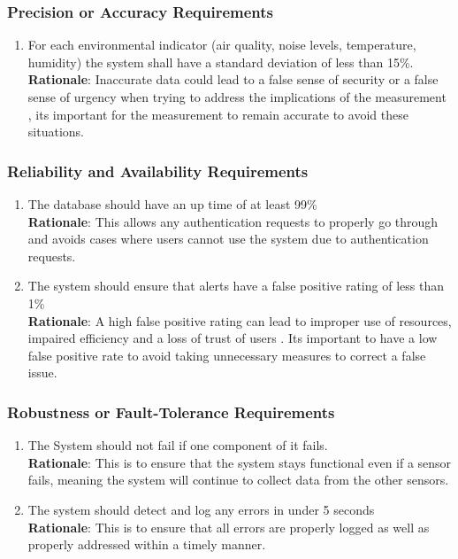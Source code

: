 \documentclass[]{article}
\begin{document}
\subsubsection{Precision or Accuracy Requirements}
\label{ssub:precision_or_accuracy_requirements}
\begin{enumerate}[{PR-PA}1. ]
	\item For each environmental indicator (air quality, noise levels, temperature, humidity) the system shall have a standard deviation of less than 15\%.\\
    \textbf{Rationale}: Inaccurate data could lead to a false sense of security or a false sense of urgency when trying to address the implications of the measurement \cite{envmon}, its important for the measurement to remain accurate to avoid these situations.
\end{enumerate}

\subsubsection{Reliability and Availability Requirements}
\label{ssub:reliability_and_availability_requirements}
\begin{enumerate}[{PR-RA}1. ]
	\item The database should have an up time of at least 99\%\\
    \textbf{Rationale}: This allows any authentication requests to properly go through and avoids cases where users cannot use the system due to authentication requests.
    \item The system should ensure that alerts have a false positive rating of less than 1\%\\
    \textbf{Rationale}: A high false positive rating can lead to improper use of resources, impaired efficiency and a loss of trust of users \cite{vwo}. Its important to have a low false positive rate to avoid taking unnecessary measures to correct a false issue.
\end{enumerate}

\subsubsection{Robustness or Fault-Tolerance Requirements}
\label{ssub:robustness_or_fault_tolerance_requirements}
\begin{enumerate}[{PR-RFT}1. ]
	\item The System should not fail if one component of it fails.\\
    \textbf{Rationale}: This is to ensure that the system stays functional even if a sensor fails, meaning the system will continue to collect data from the other sensors.
    \item The system should detect and log any errors in under 5 seconds\\
    \textbf{Rationale}: This is to ensure that all errors are properly logged as well as properly addressed within a timely manner.
\end{enumerate}
\end{document}
